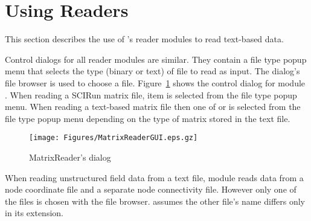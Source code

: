 \section{Using Readers}
\label{sec:using_readers}

\newcommand{\MatrixReaderGUI}{%
  \centerline{\texttt{[image: Figures/MatrixReaderGUI.eps.gz]}}
}
\begin{htmlonly}
  \newcommand{\MatrixReaderGUI}{%
    \htmladdimg[alt="MatrixReader Dialog"]{../Figures/MatrixReaderGUI.gif}
  }
\end{htmlonly}

\newcommand{\ReadFieldNet}{%
  \centerline{\texttt{[image: Figures/ReadFieldNet.eps.gz]}}
}
\begin{htmlonly}
  \newcommand{\ReadFieldNet}{%
    \htmladdimg[alt="Network that reads a text-based field"]{../Figures/ReadFieldNet.gif}
  }
\end{htmlonly}

This section describes the use of \sr{}'s reader modules to read
text-based data.

Control dialogs for all reader modules are similar.  They contain a
file type popup menu that selects the type (binary or text) of file to
read as input.  The dialog's file browser is used to choose a file.
Figure~\ref{fig:MatrixReaderGUI} shows the control dialog for module
.  When reading a SCIRun matrix file, item
 is selected from the file
type popup menu.  When reading a text-based matrix file then one of
 or
 is selected from the file type
popup menu depending on the type of matrix stored in the text file.

\begin{figure}[htb]
  \centering
  \begin{makeimage} \end{makeimage}
  \MatrixReaderGUI
  \caption{\label{fig:MatrixReaderGUI} MatrixReader's dialog}
\end{figure}


When reading unstructured field data from a text file, module
 reads data from a node coordinate file and a
separate node connectivity file.  However only one of the files is
chosen with the file browser.   assumes the other
file's name differs only in its extension.

